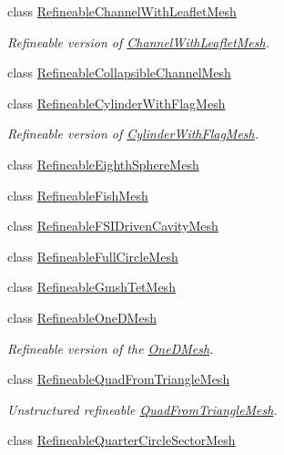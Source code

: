 \begin{DoxyCompactItemize}
class \hyperlink{classoomph_1_1RefineableChannelWithLeafletMesh}{Refineable\+Channel\+With\+Leaflet\+Mesh}
\begin{DoxyCompactList}\small\item\em Refineable version of \hyperlink{classoomph_1_1ChannelWithLeafletMesh}{Channel\+With\+Leaflet\+Mesh}. \end{DoxyCompactList}\item 
class \hyperlink{classoomph_1_1RefineableCollapsibleChannelMesh}{Refineable\+Collapsible\+Channel\+Mesh}
\item 
class \hyperlink{classoomph_1_1RefineableCylinderWithFlagMesh}{Refineable\+Cylinder\+With\+Flag\+Mesh}
\begin{DoxyCompactList}\small\item\em Refineable version of \hyperlink{classoomph_1_1CylinderWithFlagMesh}{Cylinder\+With\+Flag\+Mesh}. \end{DoxyCompactList}\item 
class \hyperlink{classoomph_1_1RefineableEighthSphereMesh}{Refineable\+Eighth\+Sphere\+Mesh}
\item 
class \hyperlink{classoomph_1_1RefineableFishMesh}{Refineable\+Fish\+Mesh}
\item 
class \hyperlink{classoomph_1_1RefineableFSIDrivenCavityMesh}{Refineable\+F\+S\+I\+Driven\+Cavity\+Mesh}
\item 
class \hyperlink{classoomph_1_1RefineableFullCircleMesh}{Refineable\+Full\+Circle\+Mesh}
\item 
class \hyperlink{classoomph_1_1RefineableGmshTetMesh}{Refineable\+Gmsh\+Tet\+Mesh}
\item 
class \hyperlink{classoomph_1_1RefineableOneDMesh}{Refineable\+One\+D\+Mesh}
\begin{DoxyCompactList}\small\item\em Refineable version of the \hyperlink{classoomph_1_1OneDMesh}{One\+D\+Mesh}. \end{DoxyCompactList}\item 
class \hyperlink{classoomph_1_1RefineableQuadFromTriangleMesh}{Refineable\+Quad\+From\+Triangle\+Mesh}
\begin{DoxyCompactList}\small\item\em Unstructured refineable \hyperlink{classoomph_1_1QuadFromTriangleMesh}{Quad\+From\+Triangle\+Mesh}. \end{DoxyCompactList}\item 
class \hyperlink{classoomph_1_1RefineableQuarterCircleSectorMesh}{Refineable\+Quarter\+Circle\+Sector\+Mesh}

\end{DoxyCompactItemize}
